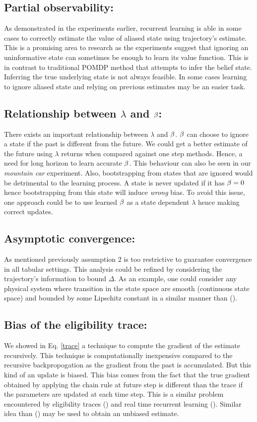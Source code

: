 \subsection{Partial observability:} As demonstrated in the experiments earlier, recurrent learning is able in some cases to correctly estimate the value of aliased state using trajectory's estimate. This is a promising area to research as the experiments suggest that ignoring an uninformative state can sometimes be enough to learn its value function. This is in contrast to traditional POMDP method that attempts to infer the belief state. Inferring the true underlying state is not always feasible. In some cases learning to ignore aliased state and relying on previous estimates may be an easier task.
\subsection{Relationship between $\lambda$ and $\beta$:} There exists an important relationship between $\lambda$ and $\beta$. $\beta$ can choose to ignore a state if the past is different from the future. We could get a better estimate of the future using $\lambda$ returns when compared against one step methods. Hence, a need for long horizon to learn accurate $\beta$. This behaviour can also be seen in our \emph{mountain car} experiment. Also, bootstrapping from states that are ignored would be detrimental to the learning process. A state is never updated if it has $\beta=0$ hence bootstrapping from this state will induce \emph{wrong} bias. To avoid this issue, one approach could be to use learned $\beta$ as a state dependent $\lambda$ hence making correct updates.
\subsection{Asymptotic convergence:} As mentioned previously assumption 2 is too restrictive to guarantee convergence in all tabular settings. This analysis could be refined by considering the trajectory's information to bound $\Delta$. As an example, one could consider any physical system where transition in the state space are smooth (continuous state space) and bounded by some Lipschitz constant in a similar manner than (\cite{shah2018q}). 
\subsection{Bias of the eligibility trace:}
We showed in Eq. \eqref{trace} a technique to compute the gradient of the estimate recursively. This technique is computationally inexpensive compared to the recursive backpropogation as the gradient from the past is accumulated. But this kind of an update is biased. This bias comes from the fact that the true gradient obtained by applying the chain rule at future step is different than the trace if the parameters are updated at each time step. This is a similar problem encountered by eligibility traces (\cite{seijen2014true}) and real time recurrent learning (\cite{williams1995gradient}). Similar idea than (\cite{seijen2014true}) may be used to obtain an unbiased estimate.
